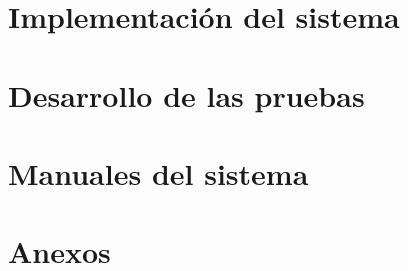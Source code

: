 \documentclass{report}
\begin{document}
\chapter{Implementación del sistema}
\label{chapter:implementacion}


\chapter{Desarrollo de las pruebas}
\label{chapter:desarrollo_pruebas}


\chapter{Manuales del sistema}
\label{chapter08}


\chapter{Anexos}
\label{anexos}


\printbibliography
\end{document}
